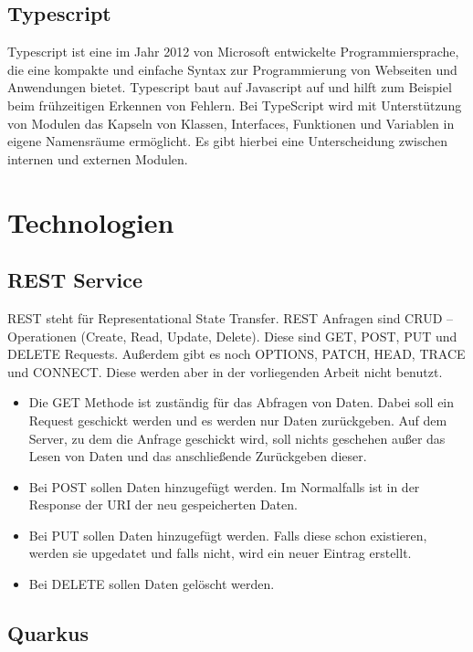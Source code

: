 \subsection{Typescript}
Typescript ist eine im Jahr 2012 von Microsoft entwickelte Programmiersprache, die eine kompakte und einfache Syntax zur Programmierung von Webseiten und Anwendungen bietet.
Typescript baut auf Javascript auf und hilft zum Beispiel beim frühzeitigen Erkennen von Fehlern.
Bei TypeScript wird mit Unterstützung von Modulen das Kapseln von Klassen, Interfaces, Funktionen und Variablen in eigene Namensräume ermöglicht.
Es gibt hierbei eine Unterscheidung zwischen internen und externen Modulen.

\section{Technologien}

\subsection{REST Service}

REST steht für Representational State Transfer.
REST Anfragen sind CRUD – Operationen (Create, Read, Update, Delete).
Diese sind GET, POST, PUT und DELETE Requests.
Außerdem gibt es noch OPTIONS, PATCH, HEAD, TRACE und CONNECT\@.
Diese werden aber in der vorliegenden Arbeit nicht benutzt.

\begin{itemize}
    \item Die GET Methode ist zuständig für das Abfragen von Daten.
    Dabei soll ein Request geschickt werden und es werden nur Daten zurückgeben.
    Auf dem Server, zu dem die Anfrage geschickt wird, soll nichts geschehen außer das Lesen von Daten und das anschließende Zurückgeben dieser.
    \item Bei POST sollen Daten hinzugefügt werden.
    Im Normalfalls ist in der Response der URI der neu gespeicherten Daten.
    \item Bei PUT sollen Daten hinzugefügt werden.
    Falls diese schon existieren, werden sie upgedatet und falls nicht, wird ein neuer Eintrag erstellt.
    \item Bei DELETE sollen Daten gelöscht werden.
\end{itemize}

\subsection{Quarkus}\label{quarkus}

